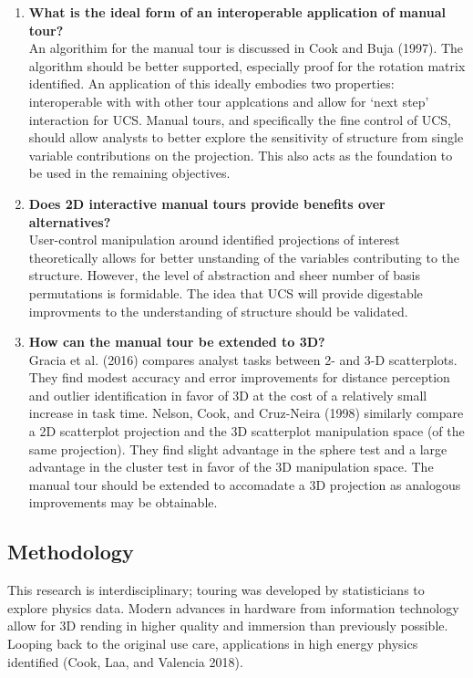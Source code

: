 \documentclass[11,]{article}
\begin{document}
\begin{enumerate}
\def\labelenumi{\arabic{enumi}.}
\item
  \textbf{What is the ideal form of an interoperable application of manual tour?}\\
  An algorithim for the manual tour is discussed in Cook and Buja (1997). The algorithm should be better supported, especially proof for the rotation matrix identified. An application of this ideally embodies two properties: interoperable with with other tour applcations and allow for `next step' interaction for UCS. Manual tours, and specifically the fine control of UCS, should allow analysts to better explore the sensitivity of structure from single variable contributions on the projection. This also acts as the foundation to be used in the remaining objectives.
\item
  \textbf{Does 2D interactive manual tours provide benefits over alternatives?}\\
  User-control manipulation around identified projections of interest theoretically allows for better unstanding of the variables contributing to the structure. However, the level of abstraction and sheer number of basis permutations is formidable. The idea that UCS will provide digestable improvments to the understanding of structure should be validated.
\item
  \textbf{How can the manual tour be extended to 3D?}\\
  Gracia et al. (2016) compares analyst tasks between 2- and 3-D scatterplots. They find modest accuracy and error improvements for distance perception and outlier identification in favor of 3D at the cost of a relatively small increase in task time. Nelson, Cook, and Cruz-Neira (1998) similarly compare a 2D scatterplot projection and the 3D scatterplot manipulation space (of the same projection). They find slight advantage in the sphere test and a large advantage in the cluster test in favor of the 3D manipulation space. The manual tour should be extended to accomadate a 3D projection as analogous improvements may be obtainable.
\end{enumerate}

\hypertarget{methodology}{%
\subsection{Methodology}\label{methodology}}

This research is interdisciplinary; touring was developed by statisticians to explore physics data. Modern advances in hardware from information technology allow for 3D rending in higher quality and immersion than previously possible. Looping back to the original use care, applications in high energy physics identified (Cook, Laa, and Valencia 2018).
\end{document}
